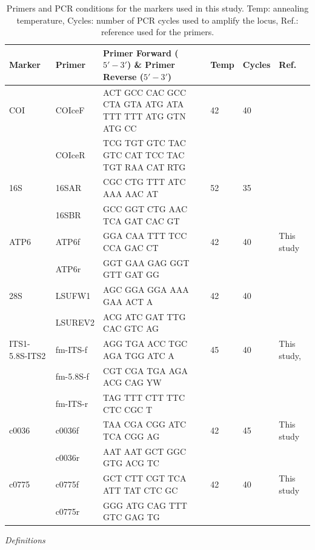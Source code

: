 \documentclass[12pt,letterpaper]{article}\usepackage[]{graphicx}\usepackage[]{color}
\renewcommand{\subsection}[1]{%
\bigskip
\begin{center}
\begin{large}
\normalfont\itshape #1
\end{large}
\end{center}}
\begin{document}
\begin{table}
  \caption{Primers and PCR conditions for the markers used in this study. Temp:
    annealing temperature, Cycles: number of PCR cycles used to amplify the
    locus, Ref.: reference used for the primers.}
\begin{tabular}{ l l p{6cm} l l p{2cm}}
  \hline
  Marker & Primer & Primer Forward ($5'-3'$) \& Primer Reverse ($5'-3'$)  & Temp &  Cycles & Ref. \\
  \hline
  COI &  COIceF  & ACT GCC CAC GCC CTA GTA ATG ATA TTT TTT ATG GTN ATG CC & 42 & 40 & \citep{Hoareau2010} \\
       & COIceR  & TCG TGT GTC TAC GTC CAT TCC TAC TGT RAA CAT RTG & & & \\
  16S & 16SAR & CGC CTG TTT ATC AAA AAC AT & 52 & 35 & \citep{Arndt1996} \\
      & 16SBR & GCC GGT CTG AAC TCA GAT CAC GT & & & \\
  ATP6 & ATP6f   & GGA CAA TTT TCC CCA GAC CT & 42 & 40 & This study \\
       & ATP6r   & GGT GAA GAG GGT GTT GAT GG & & & \\
  28S  & LSUFW1  & AGC GGA GGA AAA GAA ACT A &  42 & 40 & \citep{Sonnenberg2007} \\
       & LSUREV2 & ACG ATC GAT TTG CAC GTC AG & & & \\
  ITS1-5.8S-ITS2  & fm-ITS-f  & AGG TGA ACC TGC AGA TGG ATC A & 45 & 40 & This study, \citep{Lacey2005,Sonnenberg2007} \\
                  & fm-5.8S-f & CGT CGA TGA AGA ACG CAG YW & & & \\
                  & fm-ITS-r  & TAG TTT CTT TTC CTC CGC T  & & & \\
  c0036 & c0036f & TAA CGA CGG ATC TCA CGG AG & 42 & 45 & This study \\
        & c0036r & AAT AAT GCT GGC GTG ACG TC & & & \\
  c0775 & c0775f & GCT CTT CGT TCA ATT TAT CTC GC & 42 & 40 & This study \\
        & c0775r & GGG ATG CAG TTT GTC GAG TG & & & \\
  \hline
\end{tabular}
\label{tab:pcrConditions}
\end{table}

\subsection{Definitions}
\end{document}
